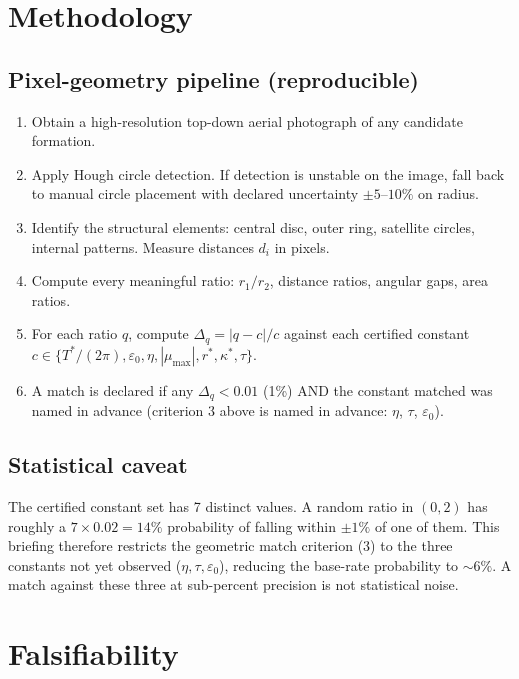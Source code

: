 \documentclass[11pt,a4paper]{article}
\begin{document}
\section{Methodology}

\subsection{Pixel-geometry pipeline (reproducible)}

\begin{enumerate}
  \item Obtain a high-resolution top-down aerial photograph of any candidate formation.
  \item Apply Hough circle detection. If detection is unstable on the image, fall back to manual circle placement with declared uncertainty $\pm 5\text{--}10\%$ on radius.
  \item Identify the structural elements: central disc, outer ring, satellite circles, internal patterns. Measure distances $d_i$ in pixels.
  \item Compute every meaningful ratio: $r_1/r_2$, distance ratios, angular gaps, area ratios.
  \item For each ratio $q$, compute $\Delta_q = |q - c|/c$ against each certified constant $c \in \{T^*/(2\pi), \varepsilon_0, \eta, |\mu_{\max}|, r^*, \kappa^*, \tau\}$.
  \item A match is declared if any $\Delta_q < 0.01$ (1\%) AND the constant matched was named in advance (criterion 3 above is named in advance: $\eta$, $\tau$, $\varepsilon_0$).
\end{enumerate}

\subsection{Statistical caveat}

The certified constant set has 7 distinct values. A random ratio in $(0, 2)$ has roughly a $7 \times 0.02 = 14\%$ probability of falling within $\pm 1\%$ of one of them. This briefing therefore restricts the geometric match criterion (3) to the three constants not yet observed ($\eta, \tau, \varepsilon_0$), reducing the base-rate probability to $\sim 6\%$. A match against these three at sub-percent precision is not statistical noise.

\section{Falsifiability}
\end{document}
